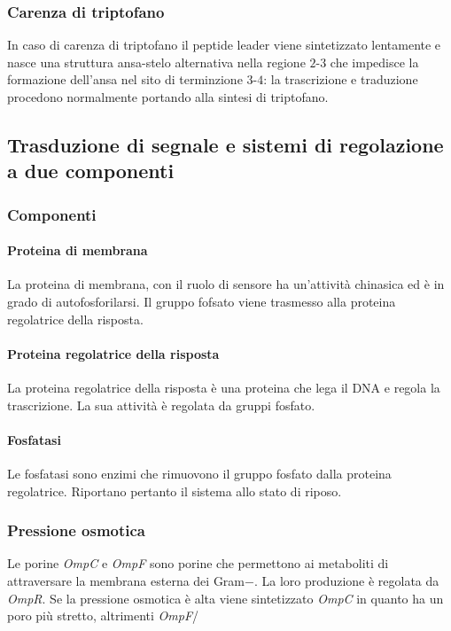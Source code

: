 		\subsubsection{Carenza di triptofano}
		In caso di carenza di triptofano il peptide leader viene sintetizzato lentamente e nasce una struttura ansa-stelo alternativa nella regione $2$-$3$ che impedisce la formazione dell'ansa nel sito di terminzione $3$-$4$: la trascrizione e traduzione procedono normalmente portando alla sintesi di triptofano.


	\subsection{Trasduzione di segnale e sistemi di regolazione a due componenti}

		\subsubsection{Componenti}

			\paragraph{Proteina di membrana}
			La proteina di membrana, con il ruolo di sensore ha un'attivit\`a chinasica ed \`e in grado di autofosforilarsi.
			Il gruppo fofsato viene trasmesso alla proteina regolatrice della risposta.

			\paragraph{Proteina regolatrice della risposta}
			La proteina regolatrice della risposta \`e una proteina che lega il DNA e regola la trascrizione.
			La sua attivit\`a \`e regolata da gruppi fosfato.

			\paragraph{Fosfatasi}
			Le fosfatasi sono enzimi che rimuovono il gruppo fosfato dalla proteina regolatrice.
			Riportano pertanto il sistema allo stato di riposo.
			
		\subsubsection{Pressione osmotica}
		Le porine \emph{OmpC} e \emph{OmpF} sono porine che permettono ai metaboliti di attraversare la membrana esterna dei Gram$-$.
		La loro produzione \`e regolata da \emph{OmpR}.
		Se la pressione osmotica \`e alta viene sintetizzato \emph{OmpC} in quanto ha un poro pi\`u stretto, altrimenti \emph{OmpF}/

